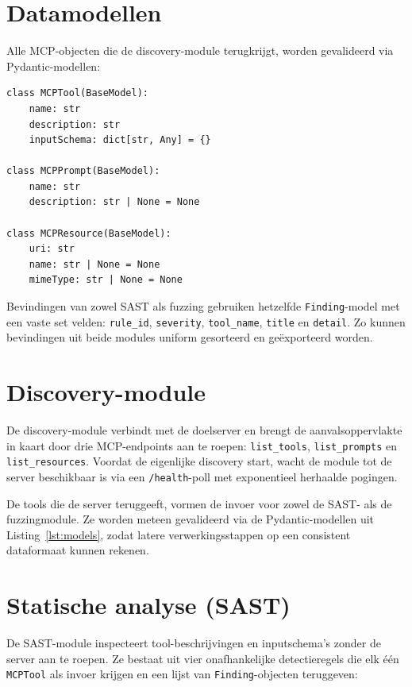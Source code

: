 \section{Datamodellen}

Alle MCP-objecten die de discovery-module terugkrijgt, worden gevalideerd via Pydantic-modellen:

\begin{listing}[htbp]
\begin{verbatim}
class MCPTool(BaseModel):
    name: str
    description: str
    inputSchema: dict[str, Any] = {}

class MCPPrompt(BaseModel):
    name: str
    description: str | None = None

class MCPResource(BaseModel):
    uri: str
    name: str | None = None
    mimeType: str | None = None
\end{verbatim}
\caption{Pydantic-modellen voor MCP-objecten (\texttt{models.py}).}
\label{lst:models}
\end{listing}

Bevindingen van zowel SAST als fuzzing gebruiken hetzelfde \texttt{Finding}-model met een vaste set velden: \texttt{rule\_id}, \texttt{severity}, \texttt{tool\_name}, \texttt{title} en \texttt{detail}. Zo kunnen bevindingen uit beide modules uniform gesorteerd en geëxporteerd worden.

\section{Discovery-module}

De discovery-module verbindt met de doelserver en brengt de aanvalsoppervlakte in kaart door drie MCP-endpoints aan te roepen: \texttt{list\_tools}, \texttt{list\_prompts} en \texttt{list\_resources}. Voordat de eigenlijke discovery start, wacht de module tot de server beschikbaar is via een \texttt{/health}-poll met exponentieel herhaalde pogingen.

De tools die de server teruggeeft, vormen de invoer voor zowel de SAST- als de fuzzingmodule. Ze worden meteen gevalideerd via de Pydantic-modellen uit Listing~\ref{lst:models}, zodat latere verwerkingsstappen op een consistent dataformaat kunnen rekenen.

\section{Statische analyse (SAST)}

De SAST-module inspecteert tool-beschrijvingen en inputschema's zonder de server aan te roepen. Ze bestaat uit vier onafhankelijke detectieregels die elk één \texttt{MCPTool} als invoer krijgen en een lijst van \texttt{Finding}-objecten teruggeven:

